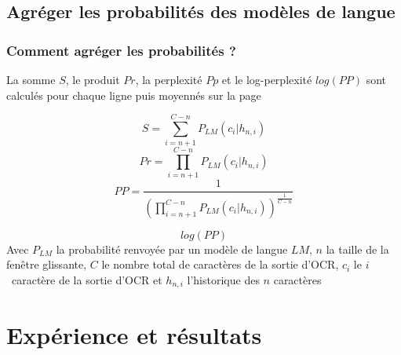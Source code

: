 \documentclass{beamer}
\begin{document}
		\subsection{Agréger les probabilités des modèles de langue}
		\begin{frame}\frametitle{Comment agréger les probabilités ?}
			\begin{footnotesize}
			La somme $S$, le produit $Pr$, la perplexité $Pp$ et le log-perplexité $log(PP)$ sont calculés pour chaque ligne puis moyennés sur la page

			$$S = \sum_{i=n+1}^{C-n}P_{LM}(c_{i} | h_{n,i})$$
			$$Pr = \prod_{i=n+1}^{C-n}P_{LM}(c_{i} | h_{n,i})$$
			$$PP = \frac{1}{(\prod_{i=n+1}^{C-n}P_{LM}(c_{i} | h_{n,i}))^{\frac{1}{C-n}}}$$
			
			$$log(PP)$$
			Avec $P_{LM}$ la probabilité renvoyée par un modèle de langue $LM$, $n$ 
	        la taille de la fenêtre glissante, $C$ le nombre total de caractères de la sortie d'OCR, $c_{i}$ 
	        le $i$\ieme~caractère de la sortie d'OCR et $h_{n,i}$ l'historique des $n$ caractères
	        \end{footnotesize}
		\end{frame}

	\section{Expérience et résultats}
\end{document}
